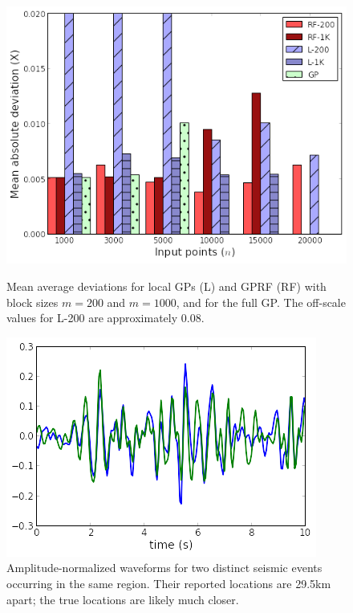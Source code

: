 \documentclass{article}
\begin{document}
\begin{figure}
    \centering
    \begin{minipage}{.45\textwidth}
        \centering
        \includegraphics[width=\textwidth]{crazylines_half}
        \caption{Mean average deviations for local GPs (L) and GPRF (RF) with
          block sizes $m=200$ and $m=1000$, and for the full GP. The off-scale
          values for L-200 are approximately 0.08.}
        \label{fig:linesresults}
    \end{minipage}%
   \qquad
    \begin{minipage}{0.45\textwidth}
        \centering
        \includegraphics[width=\textwidth]{xcorr}
        \caption{Amplitude-normalized waveforms for two distinct seismic events
          occurring in the same region. Their reported locations
          are 29.5km apart; the true locations are likely much closer. \cite{ISCcitation2015} }
        \label{fig:wavematch}
    \end{minipage}
\end{figure}
\end{document}
